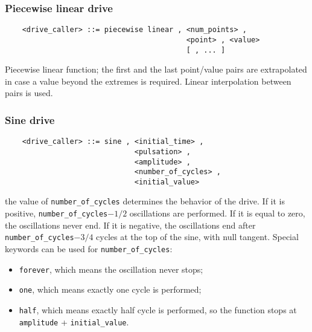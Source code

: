 \subsubsection{Piecewise linear drive}
\begin{verbatim}
    <drive_caller> ::= piecewise linear , <num_points> ,
                                          <point> , <value> 
                                          [ , ... ]
\end{verbatim}
Piecewise linear function; the first and the last point/value pairs are
extrapolated in case a value beyond the extremes is required.
Linear interpolation between pairs is used.

\subsubsection{Sine drive}
\begin{verbatim}
    <drive_caller> ::= sine , <initial_time> ,
                              <pulsation> ,
                              <amplitude> ,
                              <number_of_cycles> , 
                              <initial_value>
\end{verbatim}
the value of \texttt{number\_of\_cycles} determines the behavior of the
drive. 
If it is positive, \texttt{number\_of\_cycles}$-1/2$ oscillations are
performed. 
If it is equal to zero, the oscillations never end. 
If it is negative, the oscillations end after 
\texttt{number\_of\_cycles}$-3/4$ cycles at the top of the sine, with null
tangent.
Special keywords can be used for \texttt{number\_of\_cycles}:
\begin{itemize}
	\item \texttt{forever}, which means the oscillation never stops;
	\item \texttt{one}, which means exactly one cycle is performed;
	\item \texttt{half}, which means exactly half cycle is performed,
	so the function stops at \texttt{amplitude} + \texttt{initial\_value}.
\end{itemize}

